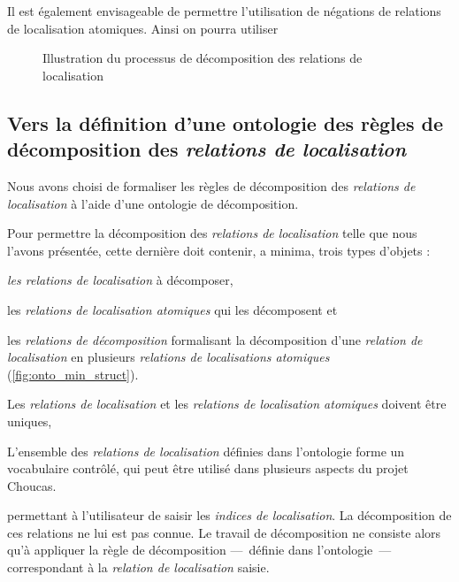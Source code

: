 

Il est également envisageable de permettre l'utilisation de négations
de relations de localisation atomiques. Ainsi on pourra utiliser

\begin{figure}
  \centering
  \missingfigure{}
  \caption{Illustration du processus de décomposition des relations de
  localisation}
  \label{fig:logique_dec}
\end{figure}

\subsection{Vers la définition d'une ontologie des règles de
  décomposition des \emph{relations de localisation}}

Nous avons choisi de formaliser les règles de décomposition des
\emph{relations de localisation} à l'aide d'une ontologie de
décomposition.

Pour permettre la décomposition des \emph{relations de localisation}
telle que nous l'avons présentée, cette dernière doit contenir, a
minima, trois types d'objets :
%
\begin{enumerate*}[label=(\alph*)]
\item \emph{les relations de localisation} à décomposer,
\item les \emph{relations de localisation atomiques} qui les
  décomposent et
\item les \emph{relations de décomposition} formalisant la
  décomposition d'une \emph{relation de localisation} en plusieurs
  \emph{relations de localisations atomiques}
  (\autoref{fig:onto_min_struct}).
\end{enumerate*}
%
Les \emph{relations de localisation} et les \emph{relations de
  localisation atomiques} doivent être uniques, 

L'ensemble des \emph{relations de localisation} définies dans
l'ontologie forme un vocabulaire contrôlé, qui peut être utilisé dans
plusieurs aspects du projet Choucas. 



permettant à l'utilisateur
de saisir les \emph{indices de localisation}. La décomposition de ces
relations ne lui est pas connue. Le travail de décomposition ne
consiste alors qu'à appliquer la règle de décomposition ---~définie
dans l'ontologie~--- correspondant à la \emph{relation de
  localisation} saisie.

